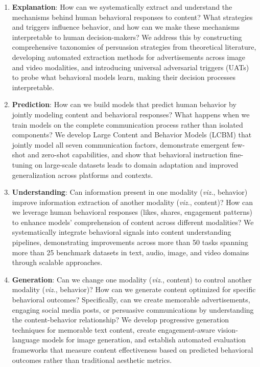 \begin{enumerate}
    \item \textbf{Explanation}: How can we systematically extract and understand the mechanisms behind human behavioral responses to content? What strategies and triggers influence behavior, and how can we make these mechanisms interpretable to human decision-makers? We address this by constructing comprehensive taxonomies of persuasion strategies from theoretical literature, developing automated extraction methods for advertisements across image and video modalities, and introducing universal adversarial triggers (UATs) to probe what behavioral models learn, making their decision processes interpretable.
    
    \item \textbf{Prediction}: How can we build models that predict human behavior by jointly modeling content and behavioral responses? What happens when we train models on the complete communication process rather than isolated components? We develop Large Content and Behavior Models (LCBM) that jointly model all seven communication factors, demonstrate emergent few-shot and zero-shot capabilities, and show that behavioral instruction fine-tuning on large-scale datasets leads to domain adaptation and improved generalization across platforms and contexts.
    
    \item \textbf{Understanding}: Can information present in one modality (\textit{viz.}, behavior) improve information extraction of another modality (\textit{viz.}, content)? How can we leverage human behavioral responses (likes, shares, engagement patterns) to enhance models' comprehension of content across different modalities? We systematically integrate behavioral signals into content understanding pipelines, demonstrating improvements across more than 50 tasks spanning more than 25 benchmark datasets in text, audio, image, and video domains through scalable approaches.
    
    \item \textbf{Generation}: Can we change one modality (\textit{viz.}, content) to control another modality (\textit{viz.}, behavior)? How can we generate content optimized for specific behavioral outcomes? Specifically, can we create memorable advertisements, engaging social media posts, or persuasive communications by understanding the content-behavior relationship? We develop progressive generation techniques for memorable text content, create engagement-aware vision-language models for image generation, and establish automated evaluation frameworks that measure content effectiveness based on predicted behavioral outcomes rather than traditional aesthetic metrics.
\end{enumerate}



